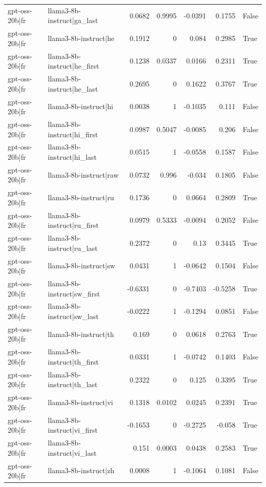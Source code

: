 \begin{table}
\begin{tabular}{l l r r r r l}
gpt-oss-20b|fr & llama3-8b-instruct|ga_last & 0.0682 & 0.9995 & -0.0391 & 0.1755 & False \\
gpt-oss-20b|fr & llama3-8b-instruct|he & 0.1912 & 0 & 0.084 & 0.2985 & True \\
gpt-oss-20b|fr & llama3-8b-instruct|he_first & 0.1238 & 0.0337 & 0.0166 & 0.2311 & True \\
gpt-oss-20b|fr & llama3-8b-instruct|he_last & 0.2695 & 0 & 0.1622 & 0.3767 & True \\
gpt-oss-20b|fr & llama3-8b-instruct|hi & 0.0038 & 1 & -0.1035 & 0.111 & False \\
gpt-oss-20b|fr & llama3-8b-instruct|hi_first & 0.0987 & 0.5047 & -0.0085 & 0.206 & False \\
gpt-oss-20b|fr & llama3-8b-instruct|hi_last & 0.0515 & 1 & -0.0558 & 0.1587 & False \\
gpt-oss-20b|fr & llama3-8b-instruct|raw & 0.0732 & 0.996 & -0.034 & 0.1805 & False \\
gpt-oss-20b|fr & llama3-8b-instruct|ru & 0.1736 & 0 & 0.0664 & 0.2809 & True \\
gpt-oss-20b|fr & llama3-8b-instruct|ru_first & 0.0979 & 0.5333 & -0.0094 & 0.2052 & False \\
gpt-oss-20b|fr & llama3-8b-instruct|ru_last & 0.2372 & 0 & 0.13 & 0.3445 & True \\
gpt-oss-20b|fr & llama3-8b-instruct|sw & 0.0431 & 1 & -0.0642 & 0.1504 & False \\
gpt-oss-20b|fr & llama3-8b-instruct|sw_first & -0.6331 & 0 & -0.7403 & -0.5258 & True \\
gpt-oss-20b|fr & llama3-8b-instruct|sw_last & -0.0222 & 1 & -0.1294 & 0.0851 & False \\
gpt-oss-20b|fr & llama3-8b-instruct|th & 0.169 & 0 & 0.0618 & 0.2763 & True \\
gpt-oss-20b|fr & llama3-8b-instruct|th_first & 0.0331 & 1 & -0.0742 & 0.1403 & False \\
gpt-oss-20b|fr & llama3-8b-instruct|th_last & 0.2322 & 0 & 0.125 & 0.3395 & True \\
gpt-oss-20b|fr & llama3-8b-instruct|vi & 0.1318 & 0.0102 & 0.0245 & 0.2391 & True \\
gpt-oss-20b|fr & llama3-8b-instruct|vi_first & -0.1653 & 0 & -0.2725 & -0.058 & True \\
gpt-oss-20b|fr & llama3-8b-instruct|vi_last & 0.151 & 0.0003 & 0.0438 & 0.2583 & True \\
gpt-oss-20b|fr & llama3-8b-instruct|zh & 0.0008 & 1 & -0.1064 & 0.1081 & False \\

\end{tabular}
\end{table}
